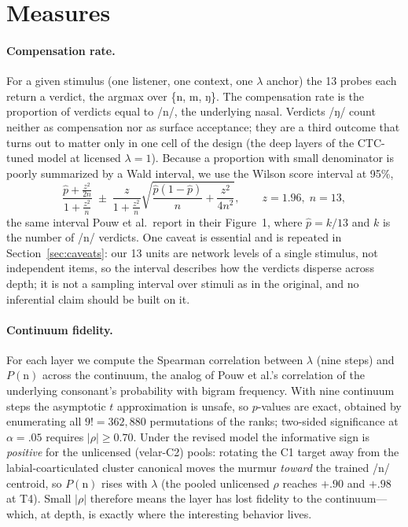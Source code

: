 \documentclass[11pt,a4paper]{article}
\newcommand{\lam}{\lambda}
\begin{document}
\section{Measures}
\label{sec:measures}

\paragraph{Compensation rate.} For a given stimulus (one listener, one
context, one $\lam$ anchor) the 13 probes each return a verdict, the
argmax over \{n, m, ŋ\}. The compensation rate is the proportion of
verdicts equal to /n/, the underlying nasal. Verdicts /ŋ/ count
neither as compensation nor as surface acceptance; they are a third
outcome that turns out to matter only in one cell of the design (the
deep layers of the CTC-tuned model at licensed $\lam=1$). Because a
proportion with small denominator is poorly summarized by a Wald
interval, we use the Wilson score interval at 95\%,
\begin{equation}
\frac{\hat p + \tfrac{z^2}{2n}}{1+\tfrac{z^2}{n}}
\;\pm\;
\frac{z}{1+\tfrac{z^2}{n}}
\sqrt{\frac{\hat p(1-\hat p)}{n}+\frac{z^2}{4n^2}},
\qquad z = 1.96,\; n = 13,
\label{eq:wilson}
\end{equation}
the same interval Pouw et al.\ report in their Figure~1, where
$\hat p = k/13$ and $k$ is the number of /n/ verdicts. One caveat is
essential and is repeated in Section~\ref{sec:caveats}: our 13 units
are network levels of a single stimulus, not independent items, so the
interval describes how the verdicts disperse across depth; it is not a
sampling interval over stimuli as in the original, and no inferential
claim should be built on it.

\paragraph{Continuum fidelity.} For each layer we compute the Spearman
correlation between $\lam$ (nine steps) and $P(\mathrm{n})$ across the
continuum, the analog of Pouw et al.'s correlation of the underlying
consonant's probability with bigram frequency. With nine continuum
steps the asymptotic $t$ approximation is unsafe, so $p$-values are
exact, obtained by enumerating all $9! = 362{,}880$ permutations of
the ranks; two-sided significance at $\alpha=.05$ requires
$|\rho| \geq 0.70$. Under the revised model the informative sign is
\emph{positive} for the unlicensed (velar-C2) pools: rotating the C1
target away from the labial-coarticulated cluster canonical moves
the murmur \emph{toward} the trained /n/ centroid, so
$P(\mathrm{n})$ rises with $\lam$ (the pooled unlicensed $\rho$
reaches $+.90$ and $+.98$ at T4). Small $|\rho|$ therefore means
the layer has lost fidelity to the continuum---which, at depth, is
exactly where the interesting behavior lives.
\end{document}
